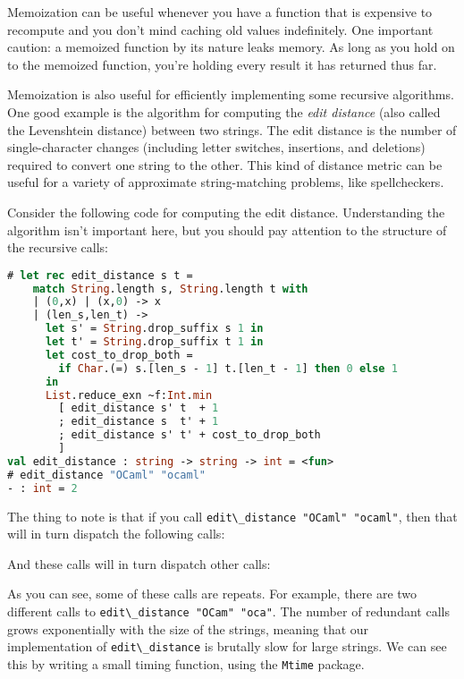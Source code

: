 Memoization can be useful whenever you have a function that is expensive
to recompute and you don't mind caching old values indefinitely. One
important caution: a memoized function by its nature leaks memory. As
long as you hold on to the memoized function, you're holding every
result it has returned thus far.

Memoization is also useful for efficiently implementing some recursive
algorithms. One good example is the algorithm for computing the
\emph{edit distance} (also called the Levenshtein distance) between two
strings. The edit distance is the number of single-character changes
(including letter switches, insertions, and deletions) required to
{convert} one string to the other. This kind of distance metric can be
useful for a variety of approximate string-matching problems, like
spellcheckers. 

Consider the following code for computing the edit distance.
Understanding the algorithm isn't important here, but you should pay
attention to the structure of the recursive calls:

\begin{lstlisting}[language=Caml]
# let rec edit_distance s t =
    match String.length s, String.length t with
    | (0,x) | (x,0) -> x
    | (len_s,len_t) ->
      let s' = String.drop_suffix s 1 in
      let t' = String.drop_suffix t 1 in
      let cost_to_drop_both =
        if Char.(=) s.[len_s - 1] t.[len_t - 1] then 0 else 1
      in
      List.reduce_exn ~f:Int.min
        [ edit_distance s' t  + 1
        ; edit_distance s  t' + 1
        ; edit_distance s' t' + cost_to_drop_both
        ]
val edit_distance : string -> string -> int = <fun>
# edit_distance "OCaml" "ocaml"
- : int = 2
\end{lstlisting}

The thing to note is that if you call
\passthrough{\lstinline!edit\_distance "OCaml" "ocaml"!}, then that will
in turn dispatch the following calls:

And these calls will in turn dispatch other calls:

As you can see, some of these calls are repeats. For example, there are
two different calls to
\passthrough{\lstinline!edit\_distance "OCam" "oca"!}. The number of
redundant calls grows exponentially with the size of the strings,
meaning that our implementation of
\passthrough{\lstinline!edit\_distance!} is brutally slow for large
strings. We can see this by writing a small timing function, using the
\passthrough{\lstinline!Mtime!} package.

